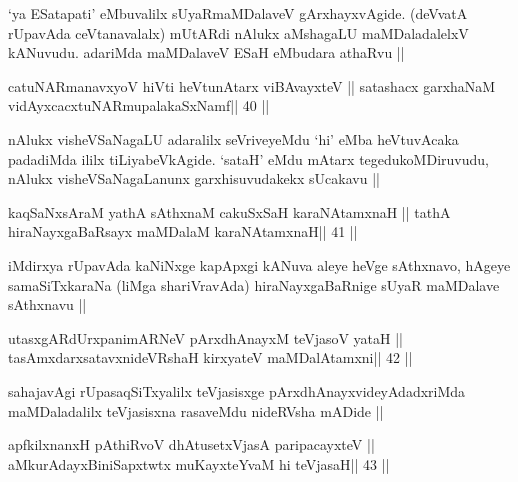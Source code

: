 \begin{artha}
`ya ESatapati' eMbuvalilx sUyaRmaMDalaveV gArxhayxvAgide. (deVvatA
rUpavAda ceVtanavalalx) mUtARdi nAlukx aMshagaLU maMDaladalelxV
kANuvudu. adariMda maMDalaveV ESaH eMbudara athaRvu ||
\end{artha}



\begin{shl}
catuNARmanavxyoV hiVti heVtunA\s tarx viBAvayxteV ||
satashacx garxhaNaM vidAyxcacxtuNARmupalakaSxNamf\hfill || 40 ||
\end{shl}

\begin{artha}
nAlukx visheVSaNagaLU adaralilx seVriveyeMdu `hi' eMba heVtuvAcaka
padadiMda ililx tiLiyabeVkAgide. `sataH' eMdu mAtarx tegedukoMDiruvudu,
nAlukx visheVSaNagaLanunx garxhisuvudakekx sUcakavu ||
\end{artha}

\begin{shl}
kaqSaNxsAraM yathA sAthxnaM cakuSxSaH karaNAtamxnaH ||
tathA hiraNayxgaBaRsayx maMDalaM karaNAtamxnaH\hfill || 41 ||
\end{shl}

\begin{artha}
iMdirxya rUpavAda kaNiNxge kapApxgi kANuva aleye heVge sAthxnavo,
hAgeye samaSiTxkaraNa (liMga shariVravAda) hiraNayxgaBaRnige sUyaR
maMDalave sAthxnavu ||
\end{artha}



\begin{shl}
utasxgARdUrxpanimARNeV pArxdhAnayxM teVjasoV yataH ||
tasAmxdarxsatavxnideVRshaH kirxyateV maMDalAtamxni\hfill || 42 ||
\end{shl}

\begin{artha}
sahajavAgi rUpasaqSiTxyalilx teVjasisxge pArxdhAnayxvideyAdadxriMda
maMDaladalilx teVjasisxna rasaveMdu nideRVsha mADide ||
\end{artha}



\begin{shl}
apfkilxnanxH pAthiRvoV dhAtusetxVjasA paripacayxteV ||
aMkurAdayxBiniSapxtwtx muKayxteYvaM hi teVjasaH\hfill || 43 ||
\end{shl}


